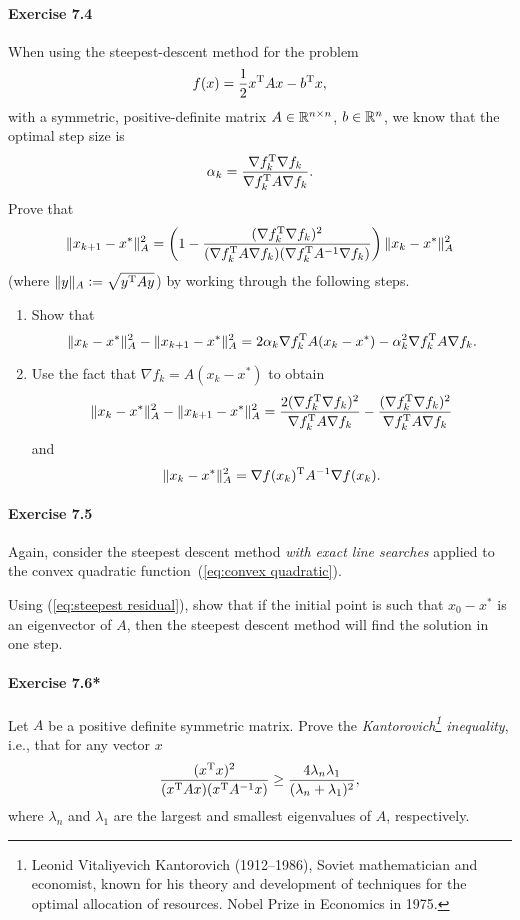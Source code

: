 \paragraph{Exercise 7.4} %
When using the steepest-descent method for the problem
\begin{equation}\label{eq:convex quadratic}
   f(x) = \frac{1}{2} x^{\text{\upshape T}} A x - b^{\text{\upshape T}} x,
\end{equation}
with a symmetric, positive-definite matrix $A\in\mathbb{R}^{n\times n}$, $b\in\mathbb{R}^n$,
we know that the optimal step size is
\[
  \alpha_k = \frac{\nabla f_k^{\text{\upshape T}} \nabla f_k}{\nabla f_k^{\text{\upshape T}} A \nabla f_k}.
\]
Prove that
\begin{equation}\label{eq:steepest residual}
  \|x_{k+1} - x^*\|_A^2
  = \left(1 - \frac{(\nabla f_k^{\text{\upshape T}}\nabla f_k)^2}{(\nabla f_k^{\text{\upshape T}} A\nabla f_k)(\nabla f_k^{\text{\upshape T}} A^{-1} \nabla f_k)}\right)\|x_{k} - x^*\|_A^2
\end{equation}
(where $\|y\|_A\mathrel{\mathop:}= \sqrt{y^{\text{\upshape T}} Ay}$)
by working through the following steps.
\begin{enumerate}
  \item Show that
\[
  \|x_k - x^*\|_A^2 - \|x_{k+1} - x^*\|_A^2 = 2\alpha_k\nabla f_k^{\text{\upshape T}} A(x_k-x^*) - \alpha_k^2 \nabla f_k^{\text{\upshape T}} A \nabla f_k.
\]
  \item Use the fact that $\nabla f_k = A(x_k - x^*)$ to obtain
    \[
      \|x_k-x^*\|_A^2 - \|x_{k+1}-x^*\|_A^2
      = \frac{2(\nabla f_k^{\text{\upshape T}} \nabla f_k)^2}{\nabla f_k^{\text{\upshape T}} A \nabla f_k} - \frac{(\nabla f_k^{\text{\upshape T}} \nabla f_k)^2}{\nabla f_k^{\text{\upshape T}} A \nabla f_k}
    \]
    and
    \[
      \|x_k-x^*\|_A^2 = \nabla f(x_k)^{\text{\upshape T}} A^{-1} \nabla f(x_k).
    \]
\end{enumerate}


\paragraph{Exercise 7.5} %
Again, consider the steepest descent method \emph{with exact line searches}
applied to the convex quadratic function~(\ref{eq:convex quadratic}).

Using (\ref{eq:steepest residual}), show that if the initial point is such
that $x_0 - x^*$ is an eigenvector of $A$, then the steepest
descent method will find the solution in one step.

\paragraph{Exercise 7.6*}
Let $A$ be a positive definite symmetric matrix. Prove the
\emph{Kantorovich\footnote{Leonid Vitaliyevich Kantorovich (1912--1986),
    Soviet mathematician and economist, known for his theory and development
    of techniques for the optimal allocation of resources. Nobel Prize in
    Economics in 1975.} inequality}, i.e., that for any vector $x$
\[
  \frac{(x^{\text{\upshape T}} x)^2}{(x^{\text{\upshape T}} A x)(x^{\text{\upshape T}} A^{-1}x)}
  \ge \frac{4\lambda_n\lambda_1}{(\lambda_n + \lambda_1)^2},
\]
where $\lambda_n$ and $\lambda_1$ are the largest and smallest eigenvalues of
$A$, respectively.

